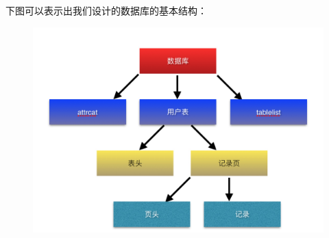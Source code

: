 下图可以表示出我们设计的数据库的基本结构：

\begin{figure}[H]
\centering
\includegraphics[width=5in]{Figures/DB.jpg}
\end{figure}

